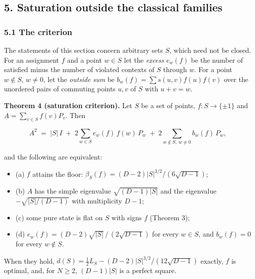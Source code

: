 \documentclass[11pt,a4paper]{article}
\providecommand{\tightlist}{\setlength{\itemsep}{0pt}\setlength{\parskip}{0pt}}
\begin{document}
\subsection{5. Saturation outside the classical families}\label{5-saturation-outside-the-classical-families}

\subsubsection{5.1 The criterion}\label{51-the-criterion}

The statements of this section concern arbitrary sets \(S\), which need not be closed. For an assignment
\(f\) and a point \(w \in S\) let the \emph{excess} \(e_w(f)\) be the number of satisfied minus the number of violated
contexts of \(S\) through \(w\). For a point \(w \notin S\), \(w \ne 0\), let the \emph{outside sum} be
\(b_w(f) = \sum s(u,v) f(u) f(v)\) over the unordered pairs of commuting points \(u, v\) of \(S\) with
\(u + v = w\).

\textbf{Theorem 4 (saturation criterion).} Let \(S\) be a set of points, \(f : S \to \{\pm1\}\) and
\(A = \sum_{v\in S} f(v) P_v\). Then

\[A^2 \;=\; |S|\, I \;+\; 2 \sum_{w \in S} e_w(f)\, f(w)\, P_w \;+\; 2 \sum_{w \notin S,\ w \neq 0} b_w(f)\, P_w ,\]

and the following are equivalent:

\begin{itemize}
\tightlist
\item
  (a) \(f\) attains the floor: \(\beta_S(f) = (D-2)|S|^{3/2}/(6\sqrt{D-1})\);
\item
  (b) \(A\) has the simple eigenvalue \(\sqrt{(D-1)|S|}\) and the eigenvalue \(-\sqrt{|S|/(D-1)}\) with multiplicity \(D-1\);
\item
  (c) some pure state is flat on \(S\) with signs \(f\) (Theorem 3);
\item
  (d) \(e_w(f) = (D-2)\sqrt{|S|}\,/\,(2\sqrt{D-1})\) for every \(w \in S\), and \(b_w(f) = 0\) for every \(w \notin S\).
\end{itemize}

When they hold, \(d(S) = \tfrac12 L_S - (D-2)|S|^{3/2}/(12\sqrt{D-1})\) exactly, \(f\) is optimal, and,
for \(N \ge 2\), \((D-1)|S|\) is a perfect square.
\end{document}
